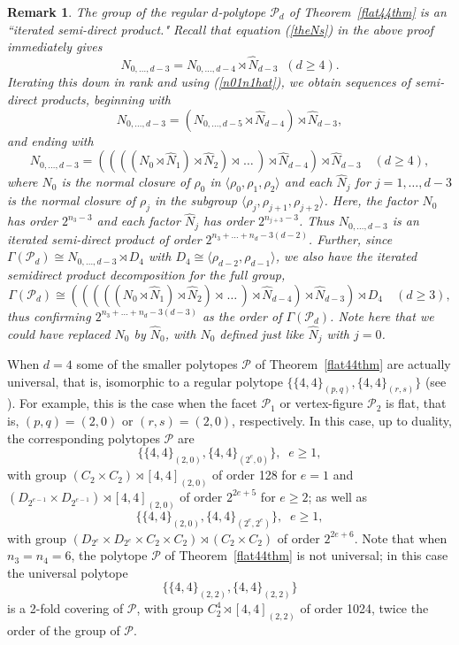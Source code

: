 \documentclass[12pt]{amsart}
\newtheorem{remark}[theorem]{Remark}
\theoremstyle{definition}
\begin{document}
\begin{remark}
The group of the regular $d$-polytope $\mathcal{P}_d$ of Theorem~\ref{flat44thm} is an ``iterated semi-direct product." Recall that equation (\ref{theNs}) in the above proof immediately gives
\[ N_{0,\ldots,d-3}=N_{0,\ldots,d-4} \rtimes \hat{N}_{d-3} \;\; (d\geq 4).\]
Iterating this down in rank and using (\ref{n01n1hat}), we obtain sequences of semi-direct products, beginning with
\[ N_{0,\ldots,d-3}=(N_{0,\ldots,d-5} \rtimes \hat{N}_{d-4})\rtimes \hat{N}_{d-3},\]
and ending with
\begin{equation}
\label{iteratedN}
N_{0,\ldots,d-3}=((((N_{0}\rtimes \hat{N}_{1})\rtimes \hat{N}_{2})\rtimes\,\ldots\,)\rtimes\hat{N}_{d-4})\rtimes\hat{N}_{d-3}\quad(d\geq 4),
\end{equation}
where $N_0$ is the normal closure of $\rho_0$ in $\langle\rho_{0},\rho_{1},\rho_{2}\rangle$ and each 
$\hat{N}_j$ for $j=1,\ldots,d-3$ is the normal closure of $\rho_{j}$ in the subgroup $\langle\rho_{j},\rho_{j+1},\rho_{j+2}\rangle$.  Here, the factor $N_0$ has order $2^{{n_3}-3}$ and each factor $\hat{N}_{j}$ has order $2^{n_{j+3}-3}$. Thus $N_{0,\ldots,d-3}$ is an iterated semi-direct product of order $2^{n_{3}+\ldots+n_{d} -3(d-2)}$. Further, since  
$\Gamma(\mathcal{P}_d)\cong N_{0,\ldots,d-3}\rtimes D_4$ with $D_4\cong\langle\rho_{d-2},\rho_{d-1}\rangle$, we also have the iterated semidirect product decomposition for the full group, 
\begin{equation}
\label{itergroup}
\Gamma(\mathcal{P}_d)
\cong (((((N_{0}\rtimes \hat{N}_{1})\rtimes \hat{N}_{2})\rtimes\,\ldots\,)\rtimes\hat{N}_{d-4})\rtimes\hat{N}_{d-3})\rtimes D_4\quad (d\geq 3),
\end{equation}
thus confirming $2^{n_{3}+\ldots+n_{d} -3(d-3)}$ as the order of $\Gamma(\mathcal{P}_d)$. Note here that we could have replaced $N_0$ by $\hat{N}_0$, with $\hat{N}_0$ defined just like $\hat{N}_j$ with $j=0$.
\end{remark}
\medskip

When $d=4$ some of the smaller polytopes $\mathcal{P}$ of Theorem~\ref{flat44thm} are actually universal, that is, isomorphic to a regular polytope $\{\{4,4\}_{(p,q)},\{4,4\}_{(r,s)}\}$ (see \cite[p.~371]{McMSch2002}). For example, this is the case when the facet $\mathcal{P}_1$ or vertex-figure $\mathcal{P}_2$ is flat, that is, $(p,q)=(2,0)$ or $(r,s)=(2,0)$, respectively. In this case, up to duality, the corresponding polytopes $\mathcal{P}$ are 
\[ \{\{4,4\}_{(2,0)},\{4,4\}_{(2^e,0)}\},\;\; e\geq 1,\] 
with group $(C_2\times C_2)\rtimes [4,4]_{(2,0)}$ of order 128 for $e=1$ and 
$(D_{2^{e-1}}\times D_{2^{e-1}})\rtimes [4,4]_{(2,0)}$ of order $2^{2e+5}$ for $e\geq 2$; as well as 
\[\{\{4,4\}_{(2,0)},\{4,4\}_{(2^e,2^e)}\},\;\; e\geq 1,\] 
with group $(D_{2^e}\times D_{2^e}\times C_2\times C_2)\rtimes (C_2\times C_2)$ of order $2^{2e+6}$. Note that when $n_{3}=n_{4}=6$, the polytope $\mathcal{P}$ of Theorem~\ref{flat44thm} is not universal; in this case the universal polytope
\[ \{\{4,4\}_{(2,2)},\{4,4\}_{(2,2)}\}\] 
is a 2-fold covering of $\mathcal{P}$, with group $C_2^4\rtimes [4,4]_{(2,2)}$ of order 1024, twice the order of the group of $\mathcal{P}$.
\smallskip
\end{document}
